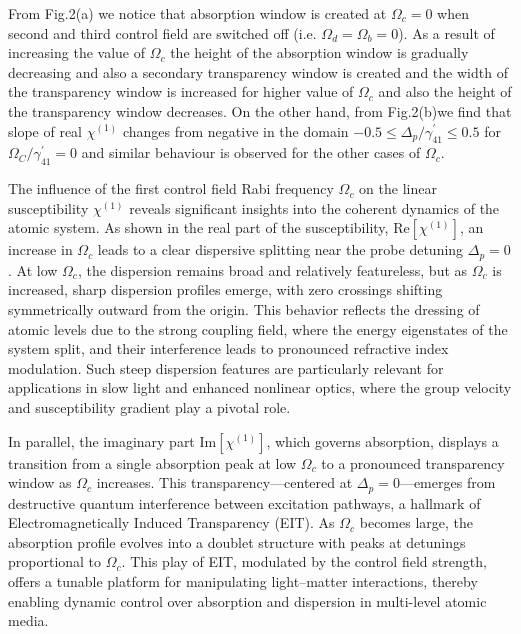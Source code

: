 \documentclass[12pt,a4paper]{article}
\begin{document}
From Fig.2(a) we notice that absorption window is created at $\Omega_{c}=0$ when second and third control field are switched off (i.e. $\Omega_{d}=\Omega_{b}=0$). As a result of increasing the value of $\Omega_{c}$ the height of the absorption window is gradually decreasing and also a secondary transparency window is created and the width of the transparency window is increased for higher value of $\Omega_{c}$ and also the height of the transparency window decreases. On the other hand, from Fig.2(b)we find that slope of real $\chi^{(1)}$ changes from negative in the domain $-0.5 \leq \Delta_{p}/\gamma^{\prime}_{41} \leq 0.5$ for $\Omega_{C}/\gamma^{\prime}_{41}=0$ and similar behaviour is observed for the other cases of $\Omega_{c}$.

The influence of the first control field Rabi frequency $\Omega_c$ on the linear susceptibility $\chi^{(1)}$ reveals significant insights into the coherent dynamics of the atomic system. As shown in the real part of the susceptibility, $\mathrm{Re}[\chi^{(1)}]$, an increase in $\Omega_c$ leads to a clear dispersive splitting near the probe detuning $\Delta_p = 0$. At low $\Omega_c$, the dispersion remains broad and relatively featureless, but as $\Omega_c$ is increased, sharp dispersion profiles emerge, with zero crossings shifting symmetrically outward from the origin. This behavior reflects the dressing of atomic levels due to the strong coupling field, where the energy eigenstates of the system split, and their interference leads to pronounced refractive index modulation. Such steep dispersion features are particularly relevant for applications in slow light and enhanced nonlinear optics, where the group velocity and susceptibility gradient play a pivotal role.

In parallel, the imaginary part $\mathrm{Im}[\chi^{(1)}]$, which governs absorption, displays a transition from a single absorption peak at low $\Omega_c$ to a pronounced transparency window as $\Omega_c$ increases. This transparency---centered at $\Delta_p = 0$---emerges from destructive quantum interference between excitation pathways, a hallmark of Electromagnetically Induced Transparency (EIT). As $\Omega_c$ becomes large, the absorption profile evolves into a doublet structure with peaks at detunings proportional to $\Omega_c$. This play of EIT, modulated by the control field strength, offers a tunable platform for manipulating light--matter interactions, thereby enabling dynamic control over absorption and dispersion in multi-level atomic media.
\end{document}
